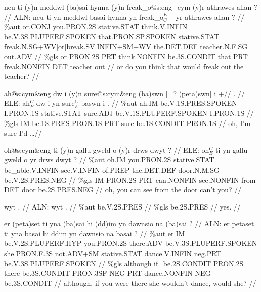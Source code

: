 \documentclass[a4paper,10pt]{article}
\begin{document}
\ex
\begingl[lingstyle=gergl]
\glchat neu ti (y)n meddwl (ba)sai hynna (y)n freak\_o@s:eng+cym (y)r athrawes allan ? //
\glsurface ALN:  neu ti yn meddwl basai hynna yn freak\_o$^{E+}_{C}$ yr athrawes allan ?  //
\glauto \%aut  or{\scriptsize .CONJ} you{\scriptsize .PRON.2S} stative{\scriptsize .STAT} think{\scriptsize .V.INFIN} be{\scriptsize .V.3S.PLUPERF.SPOKEN} that{\scriptsize .PRON.SP.SPOKEN} stative{\scriptsize .STAT} freak{\scriptsize .N.SG+WV[or]break.SV.INFIN+SM+WV} the{\scriptsize .DET.DEF} teacher{\scriptsize .N.F.SG} out{\scriptsize .ADV}   //
\glmanual \%gls  or PRON{\scriptsize .2S} PRT think{\scriptsize .NONFIN} be{\scriptsize .3S.CONDIT} that PRT freak{\scriptsize .NONFIN} DET teacher out   //
\gleng or do you think that would freak out the teacher? //
\endgl
\xe

\ex
\begingl[lingstyle=gergl]
\glchat ah@s:cym\&eng dw i (y)n sure@s:cym\&eng (ba)swn [=? (peta)swn] i +// . //
\glsurface ELE:  ah$^{C}_{E}$ dw i yn sure$^{C}_{E}$ baswn i .  //
\glauto \%aut  ah{\scriptsize .IM} be{\scriptsize .V.1S.PRES.SPOKEN} I{\scriptsize .PRON.1S} stative{\scriptsize .STAT} sure{\scriptsize .ADJ} be{\scriptsize .V.1S.PLUPERF.SPOKEN} I{\scriptsize .PRON.1S}   //
\glmanual \%gls  IM be{\scriptsize .1S.PRES} PRON{\scriptsize .1S} PRT sure be{\scriptsize .1S.CONDIT} PRON{\scriptsize .1S}   //
\gleng oh, I'm sure I'd \dots  //
\endgl
\xe

\ex
\begingl[lingstyle=gergl]
\glchat oh@s:cym\&eng ti (y)n gallu gweld o (y)r drws dwyt ? //
\glsurface ELE:  oh$^{C}_{E}$ ti yn gallu gweld o yr drws dwyt ?  //
\glauto \%aut  oh{\scriptsize .IM} you{\scriptsize .PRON.2S} stative{\scriptsize .STAT} be\_able{\scriptsize .V.INFIN} see{\scriptsize .V.INFIN} of{\scriptsize .PREP} the{\scriptsize .DET.DEF} door{\scriptsize .N.M.SG} be{\scriptsize .V.2S.PRES.NEG}   //
\glmanual \%gls  IM PRON{\scriptsize .2S} PRT can{\scriptsize .NONFIN} see{\scriptsize .NONFIN} from DET door be{\scriptsize .2S.PRES.NEG}   //
\gleng oh, you can see from the door can't you? //
\endgl
\xe

\ex
\begingl[lingstyle=gergl]
\glchat wyt . //
\glsurface ALN:  wyt .  //
\glauto \%aut  be{\scriptsize .V.2S.PRES}   //
\glmanual \%gls  be{\scriptsize .2S.PRES}   //
\gleng yes. //
\endgl
\xe

\ex
\begingl[lingstyle=gergl]
\glchat er (peta)set ti yna (ba)sai hi (dd)im yn dawnsio na (ba)sai ? //
\glsurface ALN:  er petaset ti yna basai hi ddim yn dawnsio na basai ?  //
\glauto \%aut  er{\scriptsize .IM} be{\scriptsize .V.2S.PLUPERF.HYP} you{\scriptsize .PRON.2S} there{\scriptsize .ADV} be{\scriptsize .V.3S.PLUPERF.SPOKEN} she{\scriptsize .PRON.F.3S} not{\scriptsize .ADV+SM} stative{\scriptsize .STAT} dance{\scriptsize .V.INFIN} neg{\scriptsize .PRT} be{\scriptsize .V.3S.PLUPERF.SPOKEN}   //
\glmanual \%gls  although if\_be{\scriptsize .2S.CONDIT} PRON{\scriptsize .2S} there be{\scriptsize .3S.CONDIT} PRON{\scriptsize .3SF} NEG PRT dance{\scriptsize .NONFIN} NEG be{\scriptsize .3S.CONDIT}   //
\gleng although, if you were there she wouldn't dance, would she? //
\endgl
\xe
\end{document}
